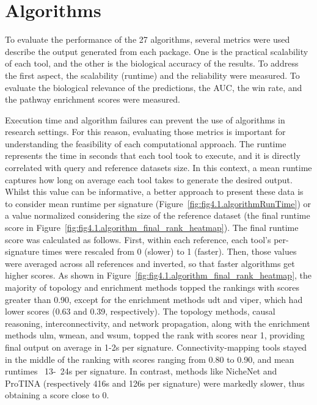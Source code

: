 \section{Algorithms} %
\label{sec:algorithms_results}

To evaluate the performance of the 27 algorithms, several metrics were used describe  the output generated from each package. One is the practical scalability of each tool, and the other is the biological accuracy of the results. To address the first aspect, the scalability (runtime) and the reliability were measured. To evaluate the biological relevance of the predictions, the \gls{AUC}, the win rate, and the pathway enrichment scores were measured.

Execution time and algorithm failures can prevent the use of algorithms in research settings. For this reason, evaluating those metrics is important for understanding the feasibility of each computational approach. The runtime represents the time in seconds that each tool took to execute, and it is directly correlated with query and reference datasets size. In this context, a mean runtime captures how long on average each tool takes to generate the desired output. Whilst this value can be informative, a better approach to present these data is to consider mean runtime per signature (Figure~\ref{fig:fig4.1.algorithmRunTime}) or a value normalized considering the size of the reference dataset (the final runtime score in Figure~\ref{fig:fig4.1.algorithm_final_rank_heatmap}). The final runtime score was calculated as follows. First, within each reference, each tool's per-signature times were rescaled from 0 (slower) to 1 (faster). Then, those values were averaged across all references and inverted, so that faster algorithms get higher scores. As shown in Figure~\ref{fig:fig4.1.algorithm_final_rank_heatmap}, the majority of topology and enrichment methods topped the rankings with scores greater than 0.90, except for the enrichment methods udt and viper, which had lower scores (0.63 and 0.39, respectively). The topology methods, causal reasoning, interconnectivity, and network propagation, along with the enrichment methods ulm, wmean, and wsum, topped the rank with scores near 1, providing final output on average in 1-2s per signature. Connectivity-mapping tools stayed in the middle of the ranking with scores ranging from 0.80 to 0.90, and mean runtimes ~13-~24s per signature. In contrast, methods like NicheNet and ProTINA (respectively 416s and 126s per signature) were markedly slower, thus obtaining a score close to 0.

